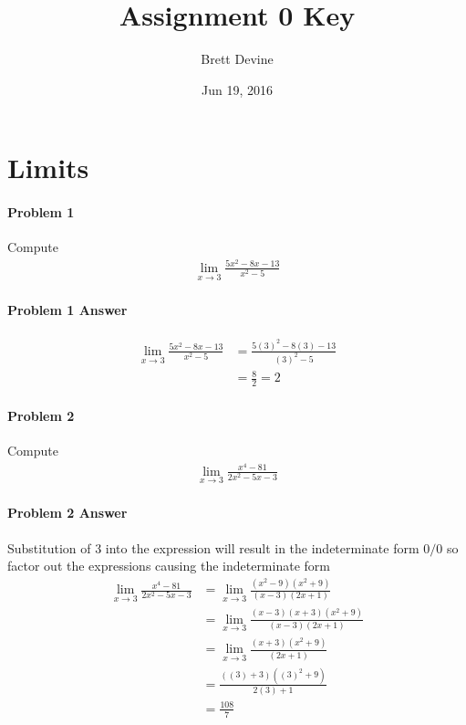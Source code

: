 \documentclass[a4paper, 11pt]{article}
\title{ Assignment 0 Key }
\author{ Brett Devine }
\date{ Jun 19, 2016 }
\begin{document}
\maketitle

\section{Limits}
\label{sec:limits}

\paragraph{Problem 1} Compute
\begin{align}
    \lim_{x\rightarrow 3} \frac{5x^2 - 8x -13}{x^2-5}  \nonumber
\end{align}

\paragraph{Problem 1 Answer}
\begin{align}
    \lim_{x\rightarrow 3} \frac{5x^2-8x-13}{x^2-5} &= \frac{5(3)^2-8(3)-13}{(3)^2-5} \nonumber \\
    &= \frac{8}{2} = 2 \nonumber 
\end{align}


\paragraph{Problem 2} Compute
\begin{align}
    \lim_{x\rightarrow 3} \frac{x^4 - 81}{2x^2-5x-3}  \nonumber
\end{align}


\paragraph{Problem 2 Answer}
Substitution of 3 into the expression will result in the indeterminate form $0/0$ so factor out the expressions causing the indeterminate form
\begin{align}
    \lim_{x\rightarrow 3} \frac{x^4 - 81}{2x^2-5x-3} &= \lim_{x\rightarrow 3} \frac{(x^2-9)(x^2+9)}{(x-3)(2x+1)} \nonumber \\
    &= \lim_{x\rightarrow 3} \frac{(x-3)(x+3)(x^2+9)}{(x-3)(2x+1)} \nonumber \\
    &= \lim_{x\rightarrow 3} \frac{(x+3)(x^2+9)}{(2x+1)} \nonumber \\
    &= \frac{((3) + 3)((3)^2 + 9)}{2(3) + 1} \nonumber \\
    &= \frac{108}{7} \nonumber   
\end{align}
\end{document}
